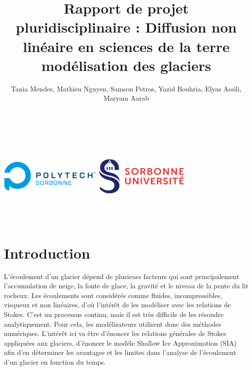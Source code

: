 \documentclass{article}
\begin{document}
\title{\textbf{Rapport de projet pluridisciplinaire :} \newline Diffusion non linéaire en sciences de la terre modélisation des glaciers}
\author{Tania Mendes, Mathieu Nguyen, Samson Petros, Yazid Bouhria, Elyas Assili, Maryam Aarab}
\maketitle
 
\vspace{50 mm}
\includegraphics[width=5cm, keepaspectratio=true, height=5cm]{Logo_Polytech_Sorbonne-2.png}\hfill\includegraphics[width=5cm, keepaspectratio=true, height=5cm]{Logo_Sorbonne_Universite-2.png}



\author{} 


\newpage

\tableofcontents

\newpage
\section{Introduction}\label{sec:intro}

L’écoulement d’un glacier dépend de plusieurs facteurs qui sont principalement l’accumulation de neige, la fonte de glace, la gravité et le niveau de la pente du lit rocheux.
Les écoulements sont considérés comme fluides, incompressibles, visqueux et non linéaires, d’où l’intérêt de les modéliser avec les relations de Stokes.
\newline
C'est un processus continu, mais il est très difficile de les résoudre analytiquement. Pour cela, les modélisateurs utilisent donc des méthodes numériques.
L’intérêt ici va être d’énoncer les relations générales de Stokes appliquées aux glaciers, d’énoncer le modèle Shallow Ice Approximation (SIA) afin d’en déterminer les avantages et les limites dans l’analyse de l’écoulement d’un glacier en fonction du temps.
\end{document}
